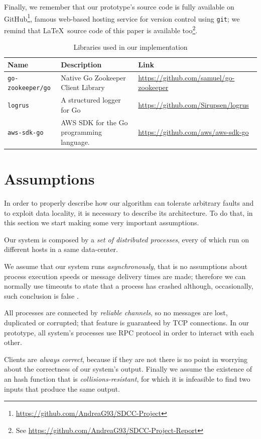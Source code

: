 \documentclass[sigchi]{acmart}
\begin{document}
Finally, we remember that our prototype's source code is fully available on GitHub\footnote{\url{https://github.com/AndreaG93/SDCC-Project}}, famous web-based hosting service for version control using \texttt{git}; we remind that \LaTeX\ source code of this paper is available too\footnote{See \url{https://github.com/AndreaG93/SDCC-Project-Report}}.  


\begin{table}
  \caption{Libraries used in our implementation}
  \label{tab:libraries}
  \begin{tabular}{l|l|l}
    \toprule
    Name & Description & Link \\
    \midrule
    \texttt{go-zookeeper/go} & Native Go Zookeeper Client Library & \url{https://github.com/samuel/go-zookeeper} \\
    \texttt{logrus} & A structured logger for Go & \url{https://github.com/Sirupsen/logrus} \\
    \texttt{aws-sdk-go} & AWS SDK for the Go programming language. & \url{https://github.com/aws/aws-sdk-go} \\
    \bottomrule
  \end{tabular}
\end{table}

\section{Assumptions}

In order to properly describe how our algorithm can tolerate arbitrary faults and to exploit data locality, it is necessary to describe its architecture. To do that, in this section we start making some very important assumptions.

Our system is composed by a \textit{set of distributed processes}, every of which run on different hosts in a same data-center.

We assume that our system runs \textit{asynchronously}, that is no assumptions about process execution speeds or message delivery times are made; therefore we can normally use timeouts to state that a process has crashed although, occasionally, such conclusion is false \cite{SDCC}.

All processes are connected by \textit{reliable channels}, so no messages are lost, duplicated or corrupted; that feature is guaranteed by TCP connections. In our prototype, all system's processes use RPC protocol in order to interact with each other.

Clients are \textit{always correct}, because if they are not there is no point in worrying about the correctness of our system's output. Finally we assume the existence of an hash function that is \textit{collisions-resistant}, for which it is infeasible to find two inputs that produce the same output.
\end{document}
